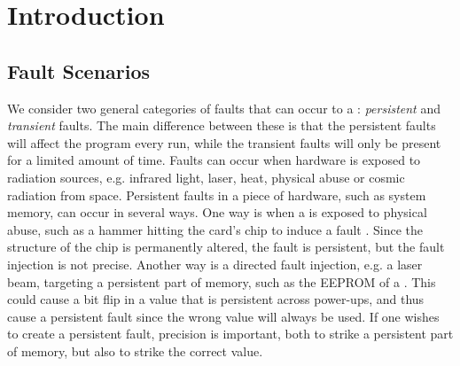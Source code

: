 \chapter{Introduction}
\section{Fault Scenarios}
We consider two general categories of faults that can occur to a \jc: \textit{persistent} and \textit{transient} faults. The main difference between these is that the persistent faults will affect the program every run, while the transient faults will only be present for a limited amount of time. Faults can occur when hardware is exposed to radiation sources, e.g. infrared light, laser, heat, physical abuse or cosmic radiation from space. 
Persistent faults in a piece of hardware, such as system memory, can occur in several ways. One way is when a \jc is exposed to physical abuse, such as a hammer hitting the card's chip to induce a fault . Since the structure of the chip is permanently altered, the fault is persistent, but the fault injection is not precise. Another way is a directed fault injection, e.g. a laser beam, targeting a persistent part of memory, such as the EEPROM of a \jc. This could cause a bit flip in a value that is persistent across power-ups, and thus cause a persistent fault since the wrong value will always be used. If one wishes to create a persistent fault, precision is important, both to strike a persistent part of memory, but also to strike the correct value.\\


